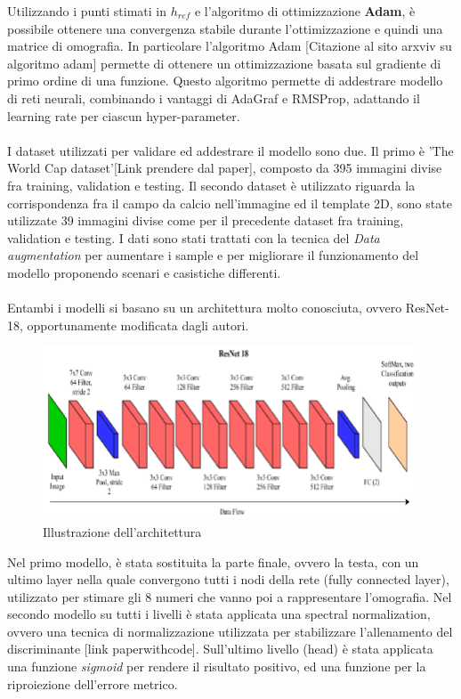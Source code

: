 \documentclass{article}
\begin{document}
Utilizzando i punti stimati in \textbf{{\begin{math}{h_{ref}}\end{math}}} e l'algoritmo di ottimizzazione \textbf{Adam}, è possibile ottenere una convergenza stabile durante l'ottimizzazione e quindi una matrice di omografia.
In particolare l'algoritmo Adam [Citazione al sito arxviv su algoritmo adam] permette di ottenere un ottimizzazione basata sul gradiente di primo ordine di una funzione. Questo algoritmo permette di addestrare modello di reti neurali, combinando i vantaggi di AdaGraf e RMSProp, adattando il learning rate per ciascun hyper-parameter. 
\\\\
I dataset utilizzati per validare ed addestrare il modello sono due.
Il primo è 'The World Cap dataset'[Link prendere dal paper], composto da 395 immagini divise fra training, validation e testing. Il secondo dataset è utilizzato riguarda la corrispondenza fra  il campo da calcio nell'immagine ed il template 2D, sono state utilizzate 39 immagini divise come per il precedente dataset fra training, validation e testing. 
I dati sono stati trattati con la tecnica del \textit{Data augmentation} per aumentare i sample e per migliorare il funzionamento del modello proponendo scenari e casistiche differenti.
\\\\
Entambi i modelli si basano su un architettura molto conosciuta, ovvero ResNet-18, opportunamente modificata dagli autori.
\begin{figure}[h]
    \centering
    \includegraphics[width=0.7\linewidth]{capitoli/resnetArch.png}
    \caption{Illustrazione dell'architettura}
    \label{fig:enter-label}
\end{figure}

Nel primo modello, è stata sostituita la parte finale, ovvero la testa, con un ultimo layer nella quale convergono tutti i nodi della rete (fully connected layer), utilizzato per stimare gli 8 numeri che vanno poi a rappresentare l'omografia.
Nel secondo modello su tutti i livelli è stata applicata una spectral normalization, ovvero una tecnica di normalizzazione utilizzata per stabilizzare l'allenamento del discriminante [link paperwithcode].
Sull'ultimo livello (head) è stata applicata una funzione \textit{sigmoid} per rendere il risultato positivo, ed una funzione per la riproiezione dell'errore metrico.
\end{document}
